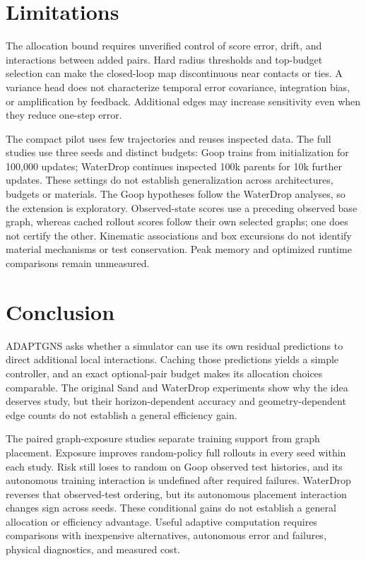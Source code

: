 
\section{Limitations}
The allocation bound requires unverified control of score error, drift, and interactions between added pairs. Hard radius thresholds and top-budget selection can make the closed-loop map discontinuous near contacts or ties. A variance head does not characterize temporal error covariance, integration bias, or amplification by feedback. Additional edges may increase sensitivity even when they reduce one-step error.

The compact pilot uses few trajectories and reuses inspected data. The full studies use three seeds and distinct budgets: Goop trains from initialization for 100,000 updates; WaterDrop continues inspected 100k parents for 10k further updates. These settings do not establish generalization across architectures, budgets or materials. The Goop hypotheses follow the WaterDrop analyses, so the extension is exploratory. Observed-state scores use a preceding observed base graph, whereas cached rollout scores follow their own selected graphs; one does not certify the other. Kinematic associations and box excursions do not identify material mechanisms or test conservation. Peak memory and optimized runtime comparisons remain unmeasured.

\section{Conclusion}
ADAPTGNS asks whether a simulator can use its own residual predictions to direct additional local interactions. Caching those predictions yields a simple controller, and an exact optional-pair budget makes its allocation choices comparable. The original Sand and WaterDrop experiments show why the idea deserves study, but their horizon-dependent accuracy and geometry-dependent edge counts do not establish a general efficiency gain.

The paired graph-exposure studies separate training support from graph placement. Exposure improves random-policy full rollouts in every seed within each study. Risk still loses to random on Goop observed test histories, and its autonomous training interaction is undefined after required failures. WaterDrop reverses that observed-test ordering, but its autonomous placement interaction changes sign across seeds. These conditional gains do not establish a general allocation or efficiency advantage. Useful adaptive computation requires comparisons with inexpensive alternatives, autonomous error and failures, physical diagnostics, and measured cost.

